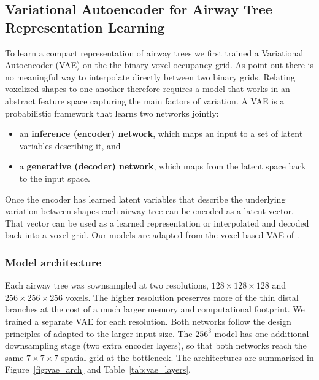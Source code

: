 
\subsection[Variational autoencoder]{Variational Autoencoder for Airway Tree Representation Learning}
\label{sec:vae}                          %

To learn a compact representation of airway trees we first trained a Variational Autoencoder (VAE) on the the binary
voxel occupancy grid. As \citet{brock2016} point out there is no meaningful way
to interpolate directly between two binary grids. Relating voxelized shapes to one another
therefore requires a model that works in an abstract feature space capturing the main
factors of variation.
A VAE is a probabilistic framework that learns two networks jointly:
\begin{itemize}                          %
  \item an \textbf{inference (encoder) network}, which maps an input to a set of latent
        variables describing it, and
  \item a \textbf{generative (decoder) network}, which maps from the latent space back to
        the input space.
\end{itemize}

Once the encoder has learned latent variables that describe the underlying variation between
shapes each airway tree can be encoded as a latent vector. That vector can be used as a
learned representation or interpolated and decoded back into a voxel grid. Our models
are adapted from the voxel-based VAE of \citet{brock2016}.

\subsubsection{Model architecture}       %
\label{sec:vae_architecture}             %


Each airway tree was sownsampled at two resolutions,
$128\times128\times128$ and $256\times256\times256$ voxels. The higher resolution preserves
more of the thin distal branches at the cost of a much larger memory and computational
footprint. We trained a separate VAE for each resolution. Both networks follow the design
principles of \citet{brock2016} adapted to the larger input size. The
$256^3$ model has one additional downsampling stage (two extra encoder layers), so that both
networks reach the same $7\times7\times7$ spatial grid at the bottleneck. The architectures
are summarized in Figure~\ref{fig:vae_arch} and Table~\ref{tab:vae_layers}.

